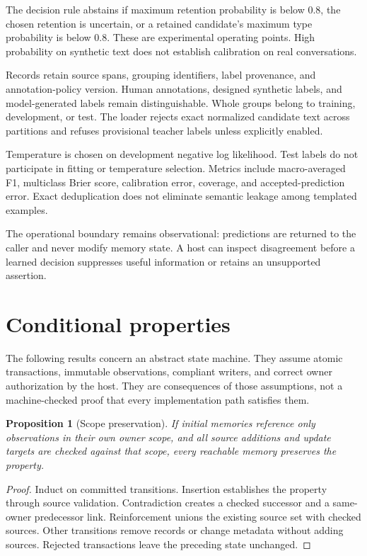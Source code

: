 \documentclass[11pt]{article}
\newtheorem{proposition}[theorem]{Proposition}
\begin{document}
The decision rule abstains if maximum retention probability is below $0.8$, the chosen retention is uncertain, or a retained candidate's maximum type probability is below $0.8$. These are experimental operating points. High probability on synthetic text does not establish calibration on real conversations.

Records retain source spans, grouping identifiers, label provenance, and annotation-policy version. Human annotations, designed synthetic labels, and model-generated labels remain distinguishable. Whole groups belong to training, development, or test. The loader rejects exact normalized candidate text across partitions and refuses provisional teacher labels unless explicitly enabled.

Temperature is chosen on development negative log likelihood. Test labels do not participate in fitting or temperature selection. Metrics include macro-averaged F1, multiclass Brier score, calibration error, coverage, and accepted-prediction error. Exact deduplication does not eliminate semantic leakage among templated examples.

The operational boundary remains observational: predictions are returned to the caller and never modify memory state. A host can inspect disagreement before a learned decision suppresses useful information or retains an unsupported assertion.

\section{Conditional properties}
The following results concern an abstract state machine. They assume atomic transactions, immutable observations, compliant writers, and correct owner authorization by the host. They are consequences of those assumptions, not a machine-checked proof that every implementation path satisfies them.

\begin{proposition}[Scope preservation]
If initial memories reference only observations in their own owner scope, and all source additions and update targets are checked against that scope, every reachable memory preserves the property.
\end{proposition}
\begin{proof}
Induct on committed transitions. Insertion establishes the property through source validation. Contradiction creates a checked successor and a same-owner predecessor link. Reinforcement unions the existing source set with checked sources. Other transitions remove records or change metadata without adding sources. Rejected transactions leave the preceding state unchanged.
\end{proof}
\end{document}
